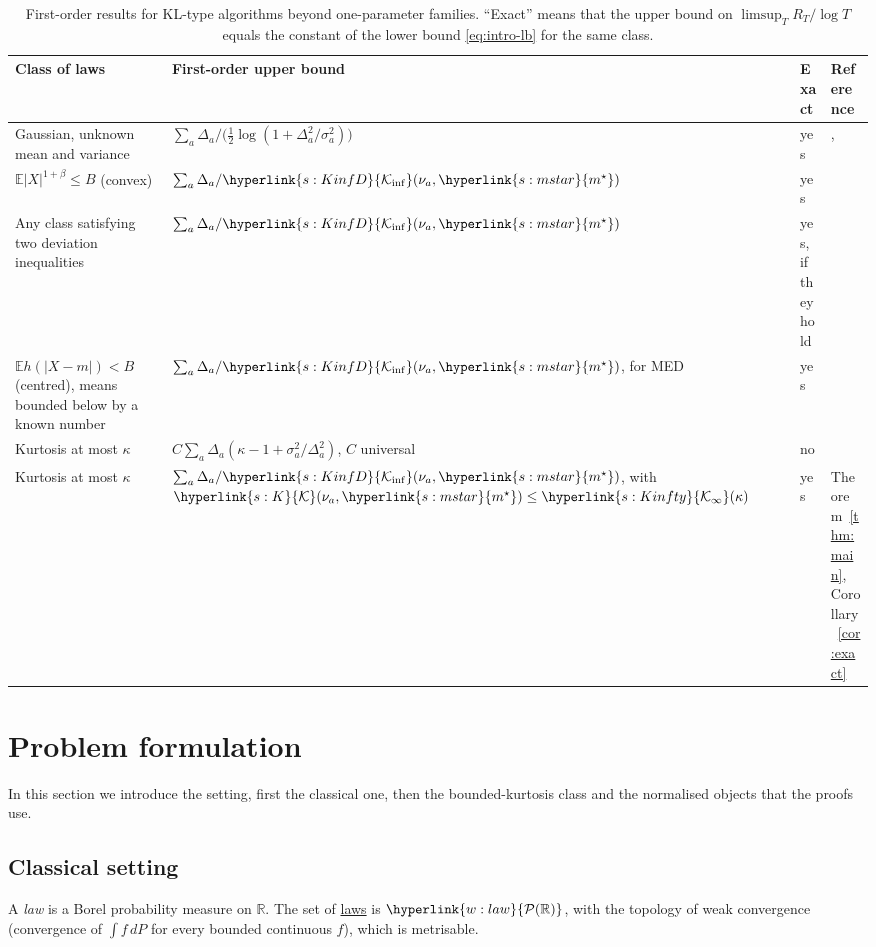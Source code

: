 \documentclass[11pt]{article}
\newcommand{\E}{\mathbb{E}}
\newcommand{\R}{\mathbb{R}}
\newcommand{\Pspace}{\term{w:law}{\mathcal{P}(\mathbb{R})}}
\newcommand{\dt}[1]{\hypertarget{#1}{}}
\newcommand{\sy}[2]{{\hyperlink{#1}{#2}}}
\newcommand{\term}[2]{\hyperlink{#1}{#2}}
\newcommand{\mstar}{\sy{s:mstar}{m^{\star}}}
\newcommand{\Kinf}{\sy{s:KinfD}{\mathcal{K}_{\inf}}}
\newcommand{\Kc}{\sy{s:K}{\mathcal{K}}}
\newcommand{\Kinfty}{\sy{s:Kinfty}{\mathcal{K}_{\infty}}}
\begin{document}
\begin{table}[t]
\centering
\small
\caption{First-order results for KL-type algorithms beyond one-parameter families. ``Exact'' means
that the upper bound on $\limsup_TR_T/\log T$ equals the constant of the lower bound
\eqref{eq:intro-lb} for the same class.}\label{tab:comparison}
\begin{tabular}{@{}p{}p{}p{}p{}@{}}
\toprule
Class of laws & First-order upper bound & Exact & Reference \\
\midrule
Gaussian, unknown mean and variance & $\sum_a\Delta_a/\bigl(\frac12\log(1+\Delta_a^2/\sigma_a^2)\bigr)$ & yes & \citet[Theorem~1]{HT14}, \citet[Theorem~5]{CHK18} \\
$\E|X|^{1+\beta}\le B$ (convex) & $\sum_a\Delta_a/\Kinf(\nu_a,\mstar)$ & yes & \citet[Corollary~2]{AJK21} \\
Any class satisfying two deviation inequalities & $\sum_a\Delta_a/\Kinf(\nu_a,\mstar)$ & yes, if they hold & \citet[Theorem~3.1]{PA26} \\
$\E h(|X-m|)<B$ (centred), means bounded below by a known number & $\sum_a\Delta_a/\Kinf(\nu_a,\mstar)$, for MED & yes & \citet[Corollary~6]{BSH23} \\
Kurtosis at most $\kappa$ & $C\sum_a\Delta_a(\kappa-1+\sigma_a^2/\Delta_a^2)$, $C$ universal & no & \citet[Theorem~2]{L17} \\
Kurtosis at most $\kappa$ & $\sum_a\Delta_a/\Kinf(\nu_a,\mstar)$, with $\Kc(\nu_a,\mstar)\le\Kinfty(\kappa)$ & yes & Theorem~\ref{thm:main}, Corollary~\ref{cor:exact} \\
\bottomrule
\end{tabular}
\end{table}

\section{Problem formulation}\label{sec:setting}

In this section we introduce the setting, first the classical one, then the bounded-kurtosis class and
the normalised objects that the proofs use.

\subsection{Classical setting}

\dt{w:law}A \emph{law} is a Borel probability measure on $\R$. The set of \term{w:law}{laws} is $\Pspace$, with the
topology of weak convergence (convergence of $\int f\,dP$ for every bounded continuous $f$), which is
metrisable.
\end{document}
